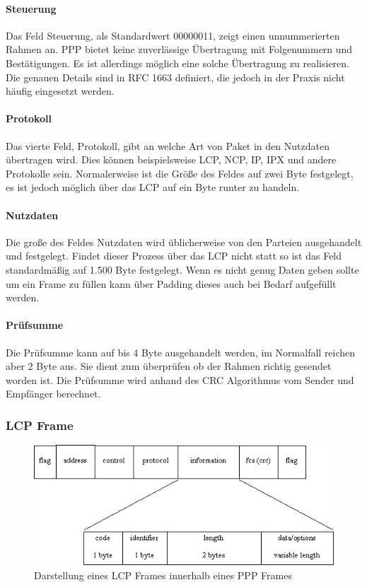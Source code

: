 \documentclass[12pt, a4paper, ngerman]{article}
\begin{document}
\paragraph{Steuerung}

Das Feld Steuerung, als Standardwert 00000011, zeigt einen unnummerierten Rahmen an. PPP bietet keine zuverlässige Übertragung mit Folgenummern und Bestätigungen. Es ist allerdings möglich eine solche Übertragung zu realisieren. Die genauen Details sind in RFC 1663 definiert, die jedoch in der Praxis nicht häufig eingesetzt werden.


\paragraph{Protokoll}

Das vierte Feld, Protokoll, gibt an welche Art von Paket in den Nutzdaten übertragen wird. Dies können beispielsweise LCP, NCP, IP, IPX und andere Protokolle sein. Normalerweise ist die Größe des Feldes auf zwei Byte festgelegt, es ist jedoch möglich über das LCP auf ein Byte runter zu handeln.


\paragraph{Nutzdaten}

Die große des Feldes Nutzdaten wird üblicherweise von den Parteien ausgehandelt und festgelegt. Findet dieser Prozess über das LCP nicht statt so ist das Feld standardmäßig auf 1.500 Byte festgelegt.
Wenn es nicht genug Daten geben sollte um ein Frame zu füllen kann über Padding dieses auch bei Bedarf aufgefüllt werden.

\paragraph{Prüfsumme}

Die Prüfsumme kann auf bis 4 Byte ausgehandelt werden, im Normalfall reichen aber 2 Byte aus. Sie dient zum überprüfen ob der Rahmen richtig gesendet worden ist. Die Prüfsumme wird anhand des CRC Algorithmus vom Sender und Empfänger berechnet. 

\subsubsection{LCP Frame}
\begin{figure}[H]
	\centering
	\includegraphics[width=1\textwidth]{Grafiken/lcp-header.jpg}	
	\caption{Darstellung eines LCP Frames innerhalb eines PPP Frames\cite{*}}
\end{figure}
\end{document}
